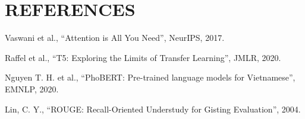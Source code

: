 \documentclass[10pt,twocolumn]{article}
\begin{document}
\vspace{1em}
\section*{REFERENCES}
\begin{enumerate}[label={[{\arabic*}]}]
\item Vaswani et al., ``Attention is All You Need'', NeurIPS, 2017.
\item Raffel et al., ``T5: Exploring the Limits of Transfer Learning'', JMLR, 2020.
\item Nguyen T. H. et al., ``PhoBERT: Pre-trained language models for Vietnamese'', EMNLP, 2020.
\item Lin, C. Y., ``ROUGE: Recall-Oriented Understudy for Gisting Evaluation'', 2004.
\end{enumerate}
\end{document}

